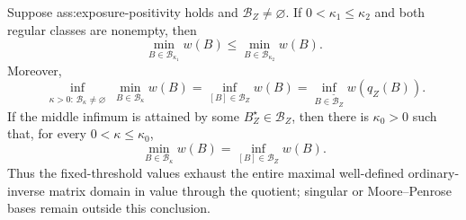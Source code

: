Suppose ass:exposure-positivity holds and \(\mathcal B_Z\ne\varnothing\).  If \(0<\kappa_1\le\kappa_2\) and both regular classes are nonempty, then
\[
\min_{B\in\mathcal B_{\kappa_1}}w(B)
\le
\min_{B\in\mathcal B_{\kappa_2}}w(B).
\]
Moreover,
\[
\inf_{\substack{\kappa>0:\,\mathcal B_\kappa\ne\varnothing}}
\min_{B\in\mathcal B_\kappa}w(B)
=
\inf_{[B]\in\mathcal B_Z}w(B)
=
\inf_{B\in\widetilde{\mathcal B}_Z}w(q_Z(B)).
\]
If the middle infimum is attained by some \(B_Z^\star\in\mathcal B_Z\), then there is \(\kappa_0>0\) such that, for every \(0<\kappa\le\kappa_0\),
\[
\min_{B\in\mathcal B_\kappa}w(B)=\inf_{[B]\in\mathcal B_Z}w(B).
\]
Thus the fixed-threshold values exhaust the entire maximal well-defined ordinary-inverse matrix domain in value through the quotient; singular or Moore--Penrose bases remain outside this conclusion.